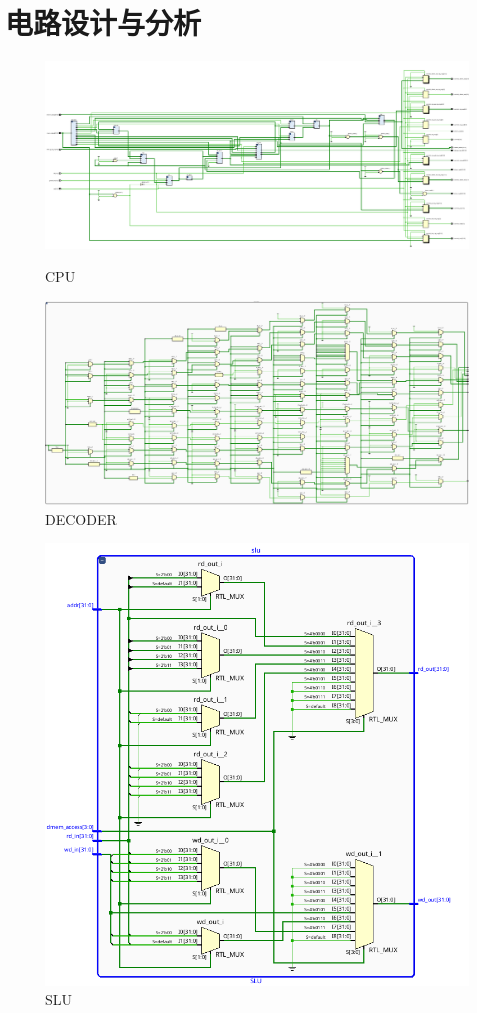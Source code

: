 \documentclass[12pt,a4paper]{ctexart}
\begin{document}
\section{电路设计与分析}
\begin{figure}[H]
    \centering
    \includegraphics[scale=0.4]{pic/9.png}
    \caption{CPU}
    \includegraphics[scale=0.4]{pic/decoder.png}
    \caption{DECODER}
\end{figure}
\begin{figure}[H]
    \centering
    \includegraphics[scale=0.7]{pic/slu.png}
    \caption{SLU}
\end{figure}
\end{document}
